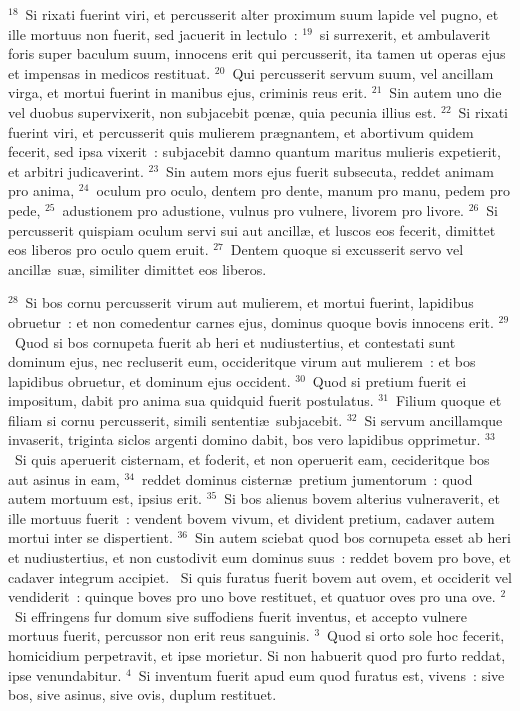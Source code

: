 ${}^{18}$~Si rixati fuerint viri, et percusserit alter proximum suum lapide vel pugno, et ille mortuus non fuerit, sed jacuerit in lectulo~:
${}^{19}$~si surrexerit, et ambulaverit foris super baculum suum, innocens erit qui percusserit, ita tamen ut operas ejus et impensas in medicos restituat.
${}^{20}$~Qui percusserit servum suum, vel ancillam virga, et mortui fuerint in manibus ejus, criminis reus erit.
${}^{21}$~Sin autem uno die vel duobus supervixerit, non subjacebit pœn\ae , quia pecunia illius est.
${}^{22}$~Si rixati fuerint viri, et percusserit quis mulierem pr\ae gnantem, et abortivum quidem fecerit, sed ipsa vixerit~: subjacebit damno quantum maritus mulieris expetierit, et arbitri judicaverint.
${}^{23}$~Sin autem mors ejus fuerit subsecuta, reddet animam pro anima,
${}^{24}$~oculum pro oculo, dentem pro dente, manum pro manu, pedem pro pede,
${}^{25}$~adustionem pro adustione, vulnus pro vulnere, livorem pro livore.
${}^{26}$~Si percusserit quispiam oculum servi sui aut ancill\ae , et luscos eos fecerit, dimittet eos liberos pro oculo quem eruit.
${}^{27}$~Dentem quoque si excusserit servo vel ancill\ae\ su\ae , similiter dimittet eos liberos.


${}^{28}$~Si bos cornu percusserit virum aut mulierem, et mortui fuerint, lapidibus obruetur~: et non comedentur carnes ejus, dominus quoque bovis innocens erit.
${}^{29}$~Quod si bos cornupeta fuerit ab heri et nudiustertius, et contestati sunt dominum ejus, nec recluserit eum, occideritque virum aut mulierem~: et bos lapidibus obruetur, et dominum ejus occident.
${}^{30}$~Quod si pretium fuerit ei impositum, dabit pro anima sua quidquid fuerit postulatus.
${}^{31}$~Filium quoque et filiam si cornu percusserit, simili sententi\ae\ subjacebit.
${}^{32}$~Si servum ancillamque invaserit, triginta siclos argenti domino dabit, bos vero lapidibus opprimetur.
${}^{33}$~Si quis aperuerit cisternam, et foderit, et non operuerit eam, cecideritque bos aut asinus in eam,
${}^{34}$~reddet dominus cistern\ae\ pretium jumentorum~: quod autem mortuum est, ipsius erit.
${}^{35}$~Si bos alienus bovem alterius vulneraverit, et ille mortuus fuerit~: vendent bovem vivum, et divident pretium, cadaver autem mortui inter se dispertient.
${}^{36}$~Sin autem sciebat quod bos cornupeta esset ab heri et nudiustertius, et non custodivit eum dominus suus~: reddet bovem pro bove, et cadaver integrum accipiet.
~Si quis furatus fuerit bovem aut ovem, et occiderit vel vendiderit~: quinque boves pro uno bove restituet, et quatuor oves pro una ove.
${}^{2}$~Si effringens fur domum sive suffodiens fuerit inventus, et accepto vulnere mortuus fuerit, percussor non erit reus sanguinis.
${}^{3}$~Quod si orto sole hoc fecerit, homicidium perpetravit, et ipse morietur. Si non habuerit quod pro furto reddat, ipse venundabitur.
${}^{4}$~Si inventum fuerit apud eum quod furatus est, vivens~: sive bos, sive asinus, sive ovis, duplum restituet.


